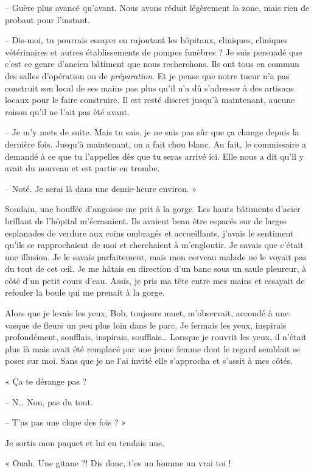 -- Guère plus avancé qu'avant. Nous avons réduit légèrement la zone, mais rien de probant pour l'instant.

-- Dis-moi, tu pourrais essayer en rajoutant les hôpitaux, cliniques, cliniques vétérinaires et autres établissements 
de pompes funèbres ? Je suis persuadé que c'est ce genre d'ancien bâtiment que nous recherchons. Ils ont tous en commun 
des salles d'opération ou de \emph{préparation}. Et je pense que notre tueur n'a pas construit son local de ses mains 
pas plus qu'il n'a dû s'adresser à des artisans locaux pour le faire construire. Il est resté discret jusqu'à 
maintenant, aucune raison qu'il ne l'ait pas été avant.

-- Je m'y mets de suite. Mais tu sais, je ne suis pas sûr que ça change depuis la dernière fois. Jusqu'à maintenant, 
on a fait chou blanc. Au fait, le commissaire a demandé à ce que tu l'appelles dès que tu seras arrivé ici. Elle nous
a dit qu'il y avait du nouveau et est partie en trombe.

-- Noté. Je serai là dans une demie-heure environ. »

Soudain, une bouffée d'angoisse me prit à la gorge. Les hauts bâtiments d'acier brillant de l'hôpital m'écrasaient. Ils 
avaient beau être espacés sur de larges esplanades de verdure aux coins ombragés et accueillants, j'avais le sentiment 
qu'ils se rapprochaient de moi et cherchaient à m'engloutir. Je savais que c'était une illusion. Je le savais 
parfaitement, mais mon cerveau malade ne le voyait pas du tout de cet œil. Je me hâtais en direction d'un banc sous un 
saule pleureur, à côté d'un petit cours d'eau. Assis, je pris ma tête entre mes mains et essayait de refouler la 
boule qui me prenait à la gorge.

Alors que je levais les yeux, Bob, toujours muet, m'observait, accoudé à une vasque de fleurs un peu plus loin dans le 
parc. Je fermais les yeux, inspirais profondément, soufflais, inspirais, soufflais… Lorsque je rouvrit les yeux, il 
n'était plus là mais avait été remplacé par une jeune femme dont le regard semblait se poser sur moi. Sans que je ne 
l'ai invité elle s'approcha et s'assit à mes côtés.

« Ça te dérange pas ?

-- N… Non, pas du tout.

-- T'as pas une clope des fois ? »

Je sortis mon paquet et lui en tendais une.

« Ouah. Une gitane ?! Dis donc, t'es un homme un vrai toi !

